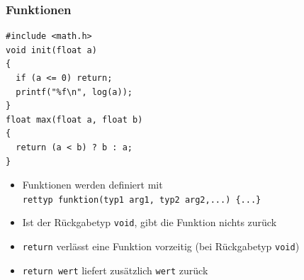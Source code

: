 \documentclass{slides}
\begin{document}
\begin{frame}[fragile]
  \frametitle{Funktionen}

\begin{lstlisting}[emph={init,max}]
#include <math.h>
void init(float a)
{
  if (a <= 0) return;
  printf("%f\n", log(a));
}
float max(float a, float b)
{
  return (a < b) ? b : a;
}
\end{lstlisting}

  \begin{itemize}
  \item Funktionen werden definiert mit\\
    \lstinline!rettyp funktion(typ1 arg1, typ2 arg2,...) {...}!
  \item Ist der Rückgabetyp \lstinline!void!, gibt die Funktion nichts zurück
  \item \lstinline!return! verlässt eine Funktion vorzeitig (bei Rückgabetyp \lstinline!void!)
  \item \lstinline!return wert! liefert zusätzlich \lstinline!wert! zurück
  \end{itemize}
\end{frame}
\end{document}
